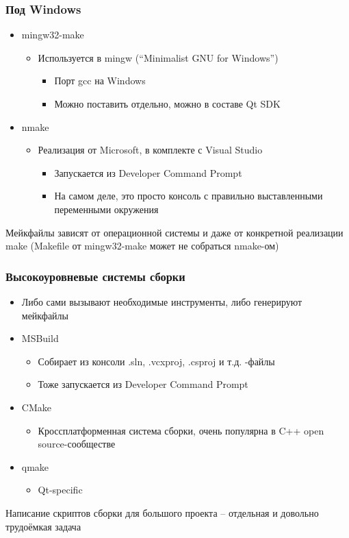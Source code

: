 \documentclass[xetex,mathserif,serif]{beamer}
\begin{document}
	\begin{frame}
		\frametitle{Под Windows}
		\begin{itemize}
			\item mingw32-make
			\begin{itemize}
				\item Используется в mingw (``Minimalist GNU for Windows'')
				\begin{itemize}
					\item Порт gcc на Windows
					\item Можно поставить отдельно, можно в составе Qt SDK
				\end{itemize}
			\end{itemize}
			\item nmake
			\begin{itemize}
				\item Реализация от Microsoft, в комплекте с Visual Studio
				\begin{itemize}
					\item Запускается из Developer Command Prompt
					\item На самом деле, это просто консоль с правильно выставленными переменными окружения
				\end{itemize}
			\end{itemize}
		\end{itemize}
		Мейкфайлы зависят от операционной системы и даже от конкретной реализации make (Makefile от mingw32-make может не собраться nmake-ом)
	\end{frame}

	\begin{frame}
		\frametitle{Высокоуровневые системы сборки}
		\begin{itemize}
			\item Либо сами вызывают необходимые инструменты, либо генерируют мейкфайлы
			\item MSBuild
			\begin{itemize}
				\item Собирает из консоли .sln, .vcxproj, .csproj и т.д. -файлы
				\item Тоже запускается из Developer Command Prompt
			\end{itemize}
			\item CMake
			\begin{itemize}
				\item Кроссплатформенная система сборки, очень популярна в C++ open source-сообществе
			\end{itemize}
			\item qmake
			\begin{itemize}
				\item Qt-specific
			\end{itemize}
		\end{itemize}
		Написание скриптов сборки для большого проекта – отдельная и довольно трудоёмкая задача
	\end{frame}
\end{document}
